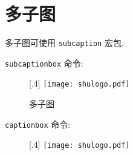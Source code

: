 \section{多子图}
多子图可使用 \texttt{subcaption} 宏包.

\texttt{subcaptionbox} 命令:

\begin{figure}[!htbp]
  \centering
  [.4\textwidth]{
    \texttt{[image: shulogo.pdf]}
  }
  \caption{多子图}
\end{figure}

\texttt{captionbox} 命令:

\begin{figure}[!htbp]
  \centering
  [.4\textwidth]{
    \texttt{[image: shulogo.pdf]}
  }
\end{figure}